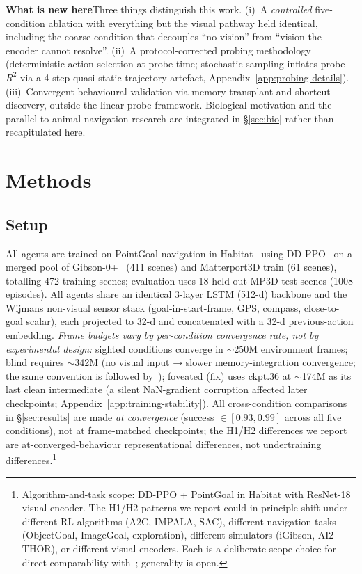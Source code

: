 \documentclass{article}
\begin{document}
\noindent\textbf{What is new here}\quad Three things distinguish this work. (i)~A \emph{controlled} five-condition ablation with everything but the visual pathway held identical, including the coarse condition that decouples ``no vision'' from ``vision the encoder cannot resolve''. (ii)~A protocol-corrected probing methodology (deterministic action selection at probe time; stochastic sampling inflates probe $R^2$ via a 4-step quasi-static-trajectory artefact, Appendix~\ref{app:probing-details}). (iii)~Convergent behavioural validation via memory transplant and shortcut discovery, outside the linear-probe framework. Biological motivation and the parallel to animal-navigation research are integrated in §\ref{sec:bio} rather than recapitulated here.


\section{Methods}

\subsection{Setup}
\label{sec:methods-setup}

All agents are trained on PointGoal navigation in Habitat~\citep{savva2019habitat} using DD-PPO~\citep{wijmans2020ddppo} on a merged pool of Gibson-0+~\citep{xia2018gibson} (411 scenes) and Matterport3D train (61 scenes), totalling 472 training scenes; evaluation uses 18 held-out MP3D test scenes (1008 episodes). All agents share an identical 3-layer LSTM (512-d) backbone and the Wijmans non-visual sensor stack (goal-in-start-frame, GPS, compass, close-to-goal scalar), each projected to 32-d and concatenated with a 32-d previous-action embedding. \emph{Frame budgets vary by per-condition convergence rate, not by experimental design:} sighted conditions converge in $\sim$250M environment frames; blind requires $\sim$342M (no visual input → slower memory-integration convergence; the same convention is followed by~\citep{wijmans2023emergence}); foveated (fix) uses ckpt.36 at $\sim$174M as its last clean intermediate (a silent NaN-gradient corruption affected later checkpoints; Appendix~\ref{app:training-stability}). All cross-condition comparisons in §\ref{sec:results} are made \emph{at convergence} (success $\in [0.93, 0.99]$ across all five conditions), not at frame-matched checkpoints; the H1/H2 differences we report are at-converged-behaviour representational differences, not undertraining differences.\footnote{\small Algorithm-and-task scope: DD-PPO + PointGoal in Habitat with ResNet-18 visual encoder. The H1/H2 patterns we report could in principle shift under different RL algorithms (A2C, IMPALA, SAC), different navigation tasks (ObjectGoal, ImageGoal, exploration), different simulators (iGibson, AI2-THOR), or different visual encoders. Each is a deliberate scope choice for direct comparability with~\citep{wijmans2023emergence}; generality is open.}
\end{document}
